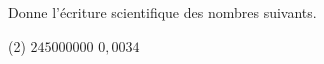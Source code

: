 %
%
    Donne l'écriture scientifique des nombres suivants.\begin{tasks}(2)
        \task $\num{245000000}$
        \task $0,0034$
    \end{tasks}
